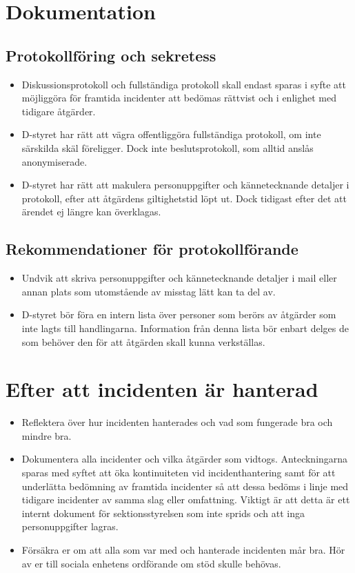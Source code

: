 \documentclass[a4paper]{dtek}
\begin{document}
\section{Dokumentation}
\subsection{Protokollföring och sekretess}
\begin{itemize}
  \item Diskussionsprotokoll och fullständiga protokoll skall endast sparas i syfte att möjliggöra för framtida incidenter att bedömas rättvist och i enlighet med tidigare åtgärder.
  \item D-styret har rätt att vägra offentliggöra fullständiga protokoll, om inte särskilda skäl föreligger. Dock inte beslutsprotokoll, som alltid anslås anonymiserade.
  \item D-styret har rätt att makulera personuppgifter och kännetecknande detaljer i protokoll, efter att åtgärdens giltighetstid löpt ut. Dock tidigast efter det att ärendet ej längre kan överklagas.
  \end{itemize}
\subsection{Rekommendationer för protokollförande}
\begin{itemize}
  \item Undvik att skriva personuppgifter och kännetecknande detaljer i mail eller annan plats som utomstående av misstag lätt kan ta del av.
  \item D-styret bör föra en intern lista över personer som berörs av åtgärder som inte lagts till handlingarna. Information från denna lista bör enbart delges de som behöver den för att åtgärden skall kunna verkställas.
\end{itemize}

\section{Efter att incidenten är hanterad}
\begin{itemize}
    \item Reflektera över hur incidenten hanterades och vad som fungerade bra och mindre bra. 
    \item Dokumentera alla incidenter och vilka åtgärder som vidtogs. Anteckningarna sparas med syftet att öka kontinuiteten vid incidenthantering samt för att underlätta bedömning av  framtida incidenter så att dessa bedöms i linje med tidigare incidenter av samma slag eller omfattning. Viktigt är att detta är ett internt dokument för sektionsstyrelsen som inte sprids och att inga personuppgifter lagras.
    \item Försäkra er om att alla som var med och hanterade incidenten mår bra. Hör av er till sociala enhetens ordförande om stöd skulle behövas.
\end{itemize}
\end{document}
